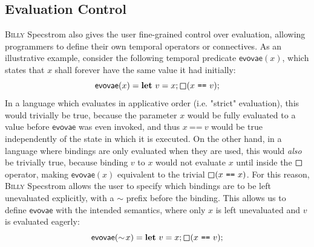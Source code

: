 \documentclass[sigplan,nonacm,10pt]{acmart}
\makeatletter
\newcommand{\Specstrom}[0]{%
  \if@ACM@anonymous%
  \textsc{Billy}%
  \else%
  Specstrom%
  \fi\xspace}
\newcommand{\Always}{\operatorname{%
  \tikz[baseline]{
    \draw[draw=white] (-0.2ex,0ex) -- (1.7ex,0ex);
    \draw[line width=.12ex,line join=round]
      (0ex,-.2ex) -- (0ex,1.3ex) -- (1.5ex,1.3ex) -- (1.5ex,.-.2ex) -- cycle;
  }}}{}
\makeatother
\begin{document}
\subsection{Evaluation Control}
\Specstrom also gives the user fine-grained control over evaluation, allowing programmers to define their own temporal operators or connectives.
As an illustrative example, consider the following temporal predicate $\mathsf{evovae}(x)$, which states that $x$ shall forever have the same value it had initially:
$$
\mathsf{evovae}(x) = \textbf{let}\ v = x; \Always(x\ \texttt{==}\ v);
$$
In a language which evaluates in applicative order (i.e. "strict" evaluation), this would trivially be true, because the parameter $x$ would be fully evaluated to a value before $\mathsf{evovae}$ was even invoked, and thus
$x\ \texttt{==}\ v$ would be true independently of the state in which it is executed. On the other hand, in a language where bindings are only evaluated when they are used, this would \emph{also} be trivially true, because binding
$v$ to $x$ would not evaluate $x$ until inside the $\Always$ operator, making $\mathsf{evovae}(x)$ equivalent to the trivial $\Always (x\ \texttt{==}\ x)$. For this reason, \Specstrom allows the user
to specify which bindings are to be left unevaluated explicitly, with a $\sim$ prefix before the binding. This allows us to define $\mathsf{evovae}$ with the intended semantics, where only $x$ is left
unevaluated and $v$ is evaluated eagerly:
$$
\mathsf{evovae}(\sim \!x) = \textbf{let}\ v = x; \Always(x\ \texttt{==}\ v);
$$
\end{document}
